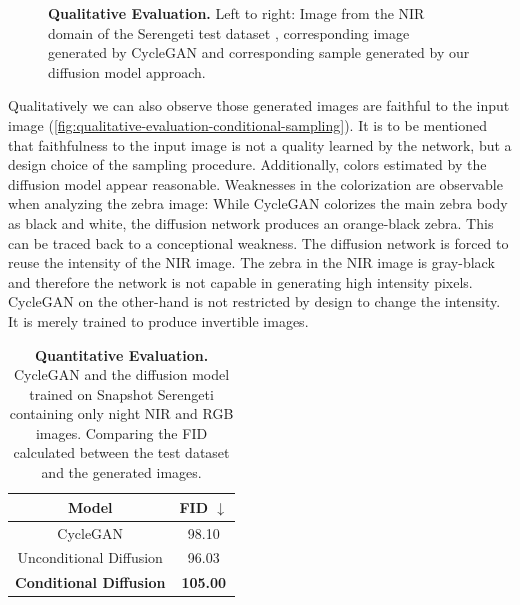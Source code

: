 \begin{figure}[htp!]
\begin{tabularx}{\textwidth}{>{\centering\arraybackslash}X >{\centering\arraybackslash}X >{\centering\arraybackslash}X >{\centering\arraybackslash}X >{\centering\arraybackslash}X >{\centering\arraybackslash}X}
    \end{tabularx}
    \caption{
        \textbf{Qualitative Evaluation.} Left to right: Image from the NIR domain of the Serengeti test dataset \parencite{serengeti},
        corresponding image generated by CycleGAN \parencite{mehri} and corresponding sample generated by our diffusion model approach.
    }
    \label{fig:qualitative-evaluation-conditional-sampling}
\end{figure}

Qualitatively we can also observe those generated images are faithful to the input image (\autoref{fig:qualitative-evaluation-conditional-sampling}).
It is to be mentioned that faithfulness to the input image is not a quality learned by the network, but a design choice of the sampling procedure.
Additionally, colors estimated by the diffusion model appear reasonable.
Weaknesses in the colorization are observable when analyzing the zebra image:
While CycleGAN colorizes the main zebra body as black and white, the diffusion network produces an orange-black zebra.
This can be traced back to a conceptional weakness.
The diffusion network is forced to reuse the intensity of the NIR image.
The zebra in the NIR image is gray-black and therefore the network is not capable in generating high intensity pixels.
CycleGAN on the other-hand is not restricted by design to change the intensity.
It is merely trained to produce invertible images.

\begin{table}[htp!]
    \centering
    \begin{tabular}{c | c}
        Model                                           & FID  $\downarrow$ \\
        \hline\hline
        CycleGAN                                        & 98.10             \\
        Unconditional Diffusion                         & 96.03             \\
        \textbf{Conditional Diffusion} \parencite{sbgm} & \textbf{105.00}
    \end{tabular}
    \caption{
        \textbf{Quantitative Evaluation.} CycleGAN and the diffusion model trained on Snapshot Serengeti \parencite{serengeti} containing only night NIR and RGB images.
        Comparing the FID calculated between the test dataset and the generated images.
    }
    \label{fig:quantitative-evaluation-conditional-sampling}
\end{table}


